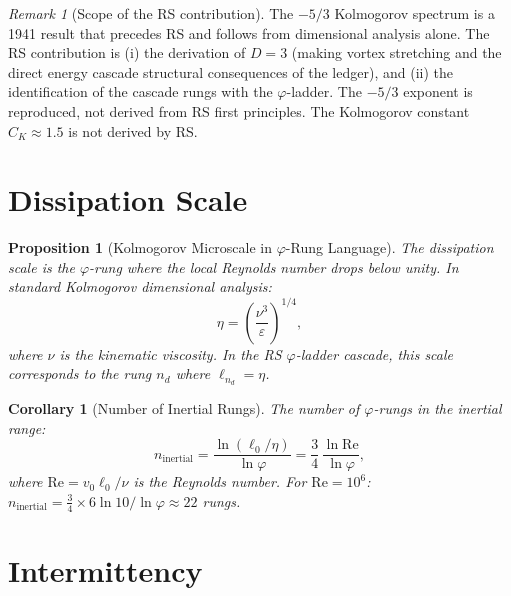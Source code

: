 \documentclass[12pt,a4paper]{article}
\newtheorem{corollary}[theorem]{Corollary}
\newtheorem{proposition}[theorem]{Proposition}
\theoremstyle{definition}
\theoremstyle{remark}
\newtheorem{remark}[theorem]{Remark}
\begin{document}
\begin{remark}[Scope of the RS contribution]
The $-5/3$ Kolmogorov spectrum is a 1941 result that precedes RS
and follows from dimensional analysis alone.  The RS contribution
is (i) the derivation of $D = 3$ (making vortex stretching and
the direct energy cascade structural consequences of the ledger),
and (ii) the identification of the cascade rungs with the
$\varphi$-ladder.  The $-5/3$ exponent is reproduced, not derived
from RS first principles.  The Kolmogorov constant $C_K \approx 1.5$
is not derived by RS.
\end{remark}

\section{Dissipation Scale}
\label{sec:dissipation}

\begin{proposition}[Kolmogorov Microscale in $\varphi$-Rung Language]
\label{thm:microscale}
The dissipation scale is the $\varphi$-rung where the local
Reynolds number drops below unity.  In standard Kolmogorov
dimensional analysis:
\begin{equation}
  \eta = \left(\frac{\nu^3}{\varepsilon}\right)^{1/4},
\end{equation}
where $\nu$ is the kinematic viscosity.  In the RS $\varphi$-ladder
cascade, this scale corresponds to the rung $n_d$ where
$\ell_{n_d} = \eta$.
\end{proposition}

\begin{corollary}[Number of Inertial Rungs]
The number of $\varphi$-rungs in the inertial range:
\begin{equation}
  n_{\mathrm{inertial}} = \frac{\ln(\ell_0/\eta)}{\ln\varphi}
  = \frac{3}{4}\,\frac{\ln\mathrm{Re}}{\ln\varphi},
\end{equation}
where $\mathrm{Re} = v_0 \ell_0/\nu$ is the Reynolds number.
For $\mathrm{Re} = 10^6$: $n_{\mathrm{inertial}} =
\tfrac{3}{4} \times 6\ln 10/\ln\varphi \approx 22$ rungs.
\end{corollary}

\section{Intermittency}
\label{sec:intermittency}
\end{document}
